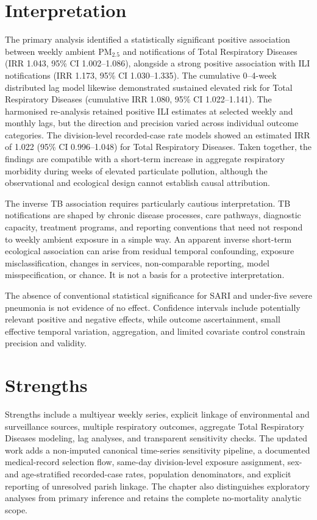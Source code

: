 \documentclass[12pt,a4paper]{report}
\newcommand{\pmfive}{PM$_{2.5}$}
\begin{document}
\section{Interpretation}
The primary analysis identified a statistically significant positive association between weekly ambient \pmfive{} and notifications of Total Respiratory Diseases (IRR 1.043, 95\% CI 1.002--1.086), alongside a strong positive association with ILI notifications (IRR 1.173, 95\% CI 1.030--1.335). The cumulative 0--4-week distributed lag model likewise demonstrated sustained elevated risk for Total Respiratory Diseases (cumulative IRR 1.080, 95\% CI 1.022--1.141). The harmonised re-analysis retained positive ILI estimates at selected weekly and monthly lags, but the direction and precision varied across individual outcome categories. The division-level recorded-case rate models showed an estimated IRR of 1.022 (95\% CI 0.996--1.048) for Total Respiratory Diseases. Taken together, the findings are compatible with a short-term increase in aggregate respiratory morbidity during weeks of elevated particulate pollution, although the observational and ecological design cannot establish causal attribution.

The inverse TB association requires particularly cautious interpretation. TB notifications are shaped by chronic disease processes, care pathways, diagnostic capacity, treatment programs, and reporting conventions that need not respond to weekly ambient exposure in a simple way. An apparent inverse short-term ecological association can arise from residual temporal confounding, exposure misclassification, changes in services, non-comparable reporting, model misspecification, or chance. It is not a basis for a protective interpretation.

The absence of conventional statistical significance for SARI and under-five severe pneumonia is not evidence of no effect. Confidence intervals include potentially relevant positive and negative effects, while outcome ascertainment, small effective temporal variation, aggregation, and limited covariate control constrain precision and validity.

\section{Strengths}
Strengths include a multiyear weekly series, explicit linkage of environmental and surveillance sources, multiple respiratory outcomes, aggregate Total Respiratory Diseases modeling, lag analyses, and transparent sensitivity checks. The updated work adds a non-imputed canonical time-series sensitivity pipeline, a documented medical-record selection flow, same-day division-level exposure assignment, sex- and age-stratified recorded-case rates, population denominators, and explicit reporting of unresolved parish linkage. The chapter also distinguishes exploratory analyses from primary inference and retains the complete no-mortality analytic scope.
\end{document}
